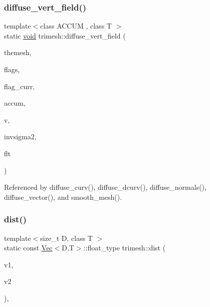\subsubsection{\texorpdfstring{diffuse\+\_\+vert\+\_\+field()}{diffuse\_vert\_field()}}
{\footnotesize\ttfamily template$<$class A\+C\+C\+UM , class T $>$ \\
static \hyperlink{namespacetrimesh_a784ddfd979e1c579bda795a8edfc3f43}{void} trimesh\+::diffuse\+\_\+vert\+\_\+field (\begin{DoxyParamCaption}\item[{\hyperlink{classtrimesh_1_1TriMesh}{Tri\+Mesh} $\ast$}]{themesh,  }\item[{vector$<$ unsigned $>$ \&}]{flags,  }\item[{unsigned \&}]{flag\+\_\+curr,  }\item[{const A\+C\+C\+UM \&}]{accum,  }\item[{int}]{v,  }\item[{float}]{invsigma2,  }\item[{T \&}]{flt }\end{DoxyParamCaption})\hspace{0.3cm}{\ttfamily [static]}}



Referenced by diffuse\+\_\+curv(), diffuse\+\_\+dcurv(), diffuse\+\_\+normals(), diffuse\+\_\+vector(), and smooth\+\_\+mesh().

\mbox{\label{namespacetrimesh_a9da3dfc5a9260f2bbb190a03f821b946}} 
\subsubsection{\texorpdfstring{dist()}{dist()}}
{\footnotesize\ttfamily template$<$size\+\_\+t D, class T $>$ \\
static const \hyperlink{classtrimesh_1_1Vec}{Vec}$<$D,T$>$\+::float\+\_\+type trimesh\+::dist (\begin{DoxyParamCaption}\item[{const \hyperlink{classtrimesh_1_1Vec}{Vec}$<$ D, T $>$ \&}]{v1,  }\item[{const \hyperlink{classtrimesh_1_1Vec}{Vec}$<$ D, T $>$ \&}]{v2 }\end{DoxyParamCaption})\hspace{0.3cm}{\ttfamily [inline]}, {\ttfamily [static]}}



